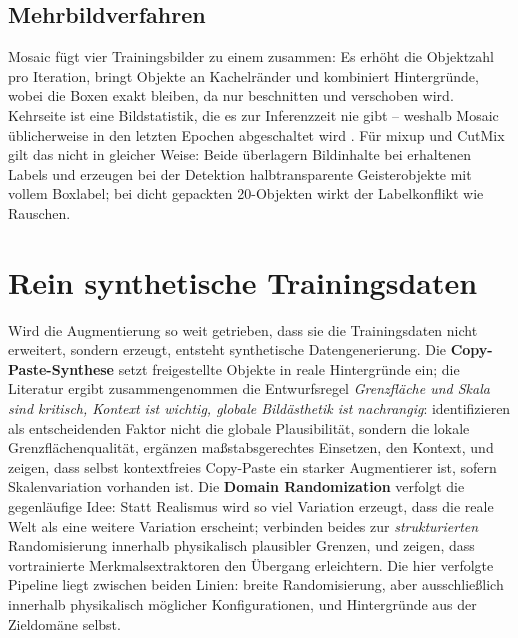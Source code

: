 \subsection{Mehrbildverfahren}

Mosaic \parencite{bochkovskiy2020} fügt vier Trainingsbilder zu einem zusammen:
Es erhöht die Objektzahl pro Iteration, bringt Objekte an Kachelränder und
kombiniert Hintergründe, wobei die Boxen exakt bleiben, da nur beschnitten und
verschoben wird. Kehrseite ist eine Bildstatistik, die es zur Inferenzzeit nie
gibt -- weshalb Mosaic üblicherweise in den letzten Epochen abgeschaltet wird
\parencite{ultralyticsdocs}. Für mixup und CutMix gilt das nicht in gleicher
Weise: Beide überlagern Bildinhalte bei erhaltenen Labels und erzeugen bei der
Detektion halbtransparente Geisterobjekte mit vollem Boxlabel; bei dicht
gepackten 20\px-Objekten wirkt der Labelkonflikt wie Rauschen.

\section{Rein synthetische Trainingsdaten}
\label{sec:augsynthese}

Wird die Augmentierung so weit getrieben, dass sie die Trainingsdaten nicht
erweitert, sondern erzeugt, entsteht synthetische Datengenerierung. Die
\textbf{Copy-Paste-Synthese} setzt freigestellte Objekte in reale Hintergründe
ein; die Literatur ergibt zusammengenommen die Entwurfsregel
\emph{Grenzfläche und Skala sind kritisch, Kontext ist wichtig, globale
Bildästhetik ist nachrangig}: \textcite{dwibedi2017} identifizieren als
entscheidenden Faktor nicht die globale Plausibilität, sondern die lokale
Grenzflächenqualität, \textcite{georgakis2017} ergänzen maßstabsgerechtes
Einsetzen, \textcite{dvornik2018} den Kontext, und \textcite{ghiasi2021} zeigen,
dass selbst kontextfreies Copy-Paste ein starker Augmentierer ist, sofern
Skalenvariation vorhanden ist. Die \textbf{Domain Randomization}
\parencite{tobin2017,tremblay2018} verfolgt die gegenläufige Idee: Statt
Realismus wird so viel Variation erzeugt, dass die reale Welt als eine weitere
Variation erscheint; \textcite{prakash2019} verbinden beides zur
\emph{strukturierten} Randomisierung innerhalb physikalisch plausibler Grenzen,
und \textcite{hinterstoisser2018} zeigen, dass vortrainierte Merkmalsextraktoren
den Übergang erleichtern. Die hier verfolgte Pipeline liegt zwischen beiden
Linien: breite Randomisierung, aber ausschließlich innerhalb physikalisch
möglicher Konfigurationen, und Hintergründe aus der Zieldomäne selbst.


